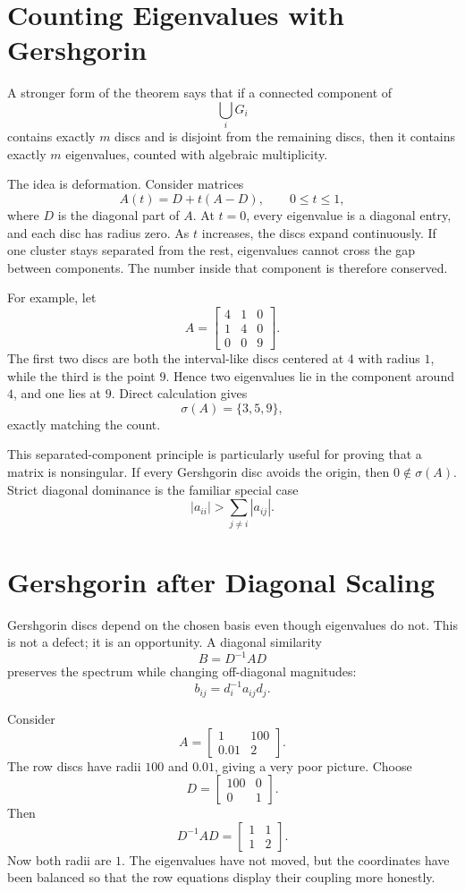 \section{Counting Eigenvalues with Gershgorin}

A stronger form of the theorem says that if a connected component of
\[
  \bigcup_iG_i
\]
contains exactly \(m\) discs and is disjoint from the remaining discs, then it contains exactly \(m\) eigenvalues, counted with algebraic multiplicity.

The idea is deformation.  Consider matrices
\[
  A(t)=D+t(A-D),
  \qquad 0\le t\le1,
\]
where \(D\) is the diagonal part of \(A\).  At \(t=0\), every eigenvalue is a diagonal entry, and each disc has radius zero.  As \(t\) increases, the discs expand continuously.  If one cluster stays separated from the rest, eigenvalues cannot cross the gap between components.  The number inside that component is therefore conserved.

For example, let
\[
  A=
  \begin{bmatrix}
    4&1&0\\
    1&4&0\\
    0&0&9
  \end{bmatrix}.
\]
The first two discs are both the interval-like discs centered at \(4\) with radius \(1\), while the third is the point \(9\).  Hence two eigenvalues lie in the component around \(4\), and one lies at \(9\).  Direct calculation gives
\[
  \sigma(A)=\{3,5,9\},
\]
exactly matching the count.

This separated-component principle is particularly useful for proving that a matrix is nonsingular.  If every Gershgorin disc avoids the origin, then \(0\notin\sigma(A)\).  Strict diagonal dominance is the familiar special case
\[
  |a_{ii}|>\sum_{j\ne i}|a_{ij}|.
\]

\section{Gershgorin after Diagonal Scaling}

Gershgorin discs depend on the chosen basis even though eigenvalues do not.  This is not a defect; it is an opportunity.  A diagonal similarity
\[
  B=D^{-1}AD
\]
preserves the spectrum while changing off-diagonal magnitudes:
\[
  b_{ij}=d_i^{-1}a_{ij}d_j.
\]

Consider
\[
  A=
  \begin{bmatrix}
    1&100\\
    0.01&2
  \end{bmatrix}.
\]
The row discs have radii \(100\) and \(0.01\), giving a very poor picture.  Choose
\[
  D=
  \begin{bmatrix}
    100&0\\
    0&1
  \end{bmatrix}.
\]
Then
\[
  D^{-1}AD
  =
  \begin{bmatrix}
    1&1\\
    1&2
  \end{bmatrix}.
\]
Now both radii are \(1\).  The eigenvalues have not moved, but the coordinates have been balanced so that the row equations display their coupling more honestly.

